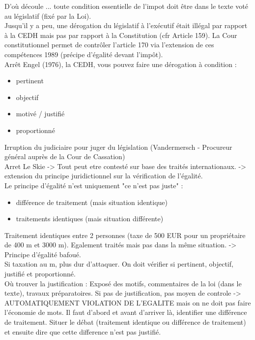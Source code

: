 \documentclass{book}
\begin{document}
D'où découle ... toute condition essentielle de l'impot doit être dans le texte voté au législatif (fixé par la Loi).\\

Jusqu'il y a peu, une dérogation du législatif à l'exécutif était illégal par rapport à la CEDH mais pas par rapport à la Constitution (cfr Article 159). La Cour constitutionnel permet de contrôler l'article 170 via l'extension de ces compétences 1989 (précipe d'égalité devant l'impôt).\\

Arrêt Engel (1976), la CEDH, vous pouvez faire une dérogation à condition : \\

\begin{itemize}
\item pertinent
\item objectif
\item motivé / justifié
\item proportionné
\end{itemize}
\null
Irruption du judiciaire pour juger du législation (Vandermersch - Procureur général auprès de la Cour de Cassation)\\

Arret Le Skie -> Tout peut etre contesté sur base des traités internationaux. -> extension du principe juridictionnel sur la vérification de l'égalité.\\

Le principe d'égalité n'est uniquement "ce n'est pas juste" :\\

\begin{itemize}
\item différence de traitement (mais situation identique)
\item traitements identiques (mais situation différente)
\end{itemize}
\null
Traitement identiques entre 2 personnes (taxe de 500 EUR pour un propriétaire de 400 m et 3000 m). Egalement traités mais pas dans la même situation. -> Principe d'égalité bafoué.\\

Si taxation au m, plus dur d'attaquer. On doit vérifier si pertinent, objectif, justifié et proportionné.\\

Où trouver la justification : Exposé des motifs, commentaires de la loi (dans le texte), travaux préparatoires. Si pas de justification, pas moyen de controle -> AUTOMATIQUEMENT VIOLATION DE L'EGALITE mais on ne doit pas faire l'économie de mots. Il faut d'abord et avant d'arriver là, identifier une différence de traitement. Situer le débat (traitement identique ou différence de traitement) et ensuite dire que cette difference n'est pas justifié.\\
\end{document}
